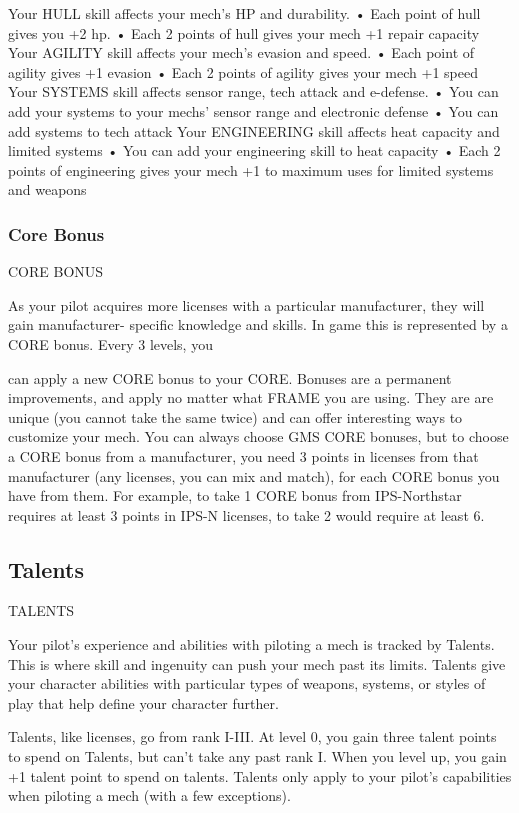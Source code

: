 Your HULL skill affects your mech’s HP and durability.
       •  Each point of hull gives you +2 hp.
       •  Each 2 points of hull gives your mech +1 repair capacity
Your AGILITY skill affects your mech’s evasion and speed.
       •  Each point of agility gives +1 evasion
       •  Each 2 points of agility gives your mech +1 speed
Your SYSTEMS skill affects sensor range, tech attack and e-defense.
       •  You can add your systems to your mechs’ sensor range and electronic defense
       •  You can add systems to tech attack
Your ENGINEERING skill affects heat capacity and limited systems
       •  You can add your engineering skill to heat capacity
       •  Each 2 points of engineering gives your mech +1 to maximum uses for limited systems
         and weapons
\subsubsection{Core Bonus}
                                              CORE BONUS

As your pilot acquires more licenses with a particular manufacturer, they will gain manufacturer-
specific knowledge and skills. In game this is represented by a CORE bonus. Every 3 levels, you




can apply a new CORE bonus to your CORE. Bonuses are a permanent improvements, and
apply no matter what FRAME you are using. They are are unique (you cannot take the same
twice) and can offer interesting ways to customize your mech. You can always choose GMS
CORE bonuses, but to choose a CORE bonus from a manufacturer, you need 3 points in licenses
from that manufacturer (any licenses, you can mix and match), for each CORE bonus you have
from them. For example, to take 1 CORE bonus from IPS-Northstar requires at least 3 points in
IPS-N licenses, to take 2 would require at least 6.

\subsection{Talents}
                                                 TALENTS

Your pilot’s experience and abilities with piloting a mech is tracked by Talents. This is where skill
and ingenuity can push your mech past its limits. Talents give your character abilities with
particular types of weapons, systems, or styles of play that help define your character further.


Talents, like licenses, go from rank I-III. At level 0, you gain three talent points to spend on
Talents, but can’t take any past rank I. When you level up, you gain +1 talent point to spend on
talents. Talents only apply to your pilot’s capabilities when piloting a mech (with a few
exceptions).


